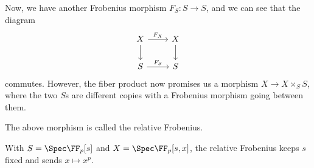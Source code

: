 \documentclass[../notes.tex]{subfiles}
\begin{document}
Now, we have another Frobenius morphism $F_S\colon S\to S$, and we can see that the diagram
\[\begin{tikzcd}
	X & X \\
	S & S
	\arrow["{F_X}", from=1-1, to=1-2]
	\arrow["{F_S}", from=2-1, to=2-2]
	\arrow[from=1-1, to=2-1]
	\arrow[from=1-2, to=2-2]
\end{tikzcd}\]
commutes. However, the fiber product now promises us a morphism $X\to X\times_SS$, where the two $S$s are different copies with a Frobenius morphism going between them.
\begin{remark}
	The above morphism is called the relative Frobenius.
\end{remark}
\begin{example}
	With $S=\Spec\FF_p[s]$ and $X=\Spec\FF_p[s,x]$, the relative Frobenius keeps $s$ fixed and sends $x\mapsto x^p$.
\end{example}
\end{document}
